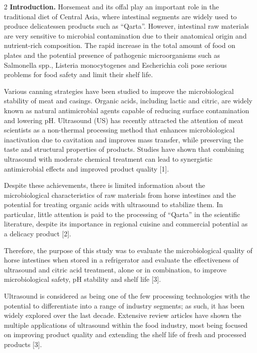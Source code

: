\begin{multicols}{2}
{\bfseries Introduction.} Horsemeat and its offal play an important role in
the traditional diet of Central Asia, where intestinal segments are
widely used to produce delicatessen products such as ``Qarta''. However,
intestinal raw materials are very sensitive to microbial contamination
due to their anatomical origin and nutrient-rich composition. The rapid
increase in the total amount of food on plates and the potential
presence of pathogenic microorganisms such as Salmonella spp., Listeria
monocytogenes and Escherichia coli pose serious problems for food safety
and limit their shelf life.

Various canning strategies have been studied to improve the
microbiological stability of meat and casings. Organic acids, including
lactic and citric, are widely known as natural antimicrobial agents
capable of reducing surface contamination and lowering pH. Ultrasound
(US) has recently attracted the attention of meat scientists as a
non-thermal processing method that enhances microbiological inactivation
due to cavitation and improves mass transfer, while preserving the taste
and structural properties of products. Studies have shown that combining
ultrasound with moderate chemical treatment can lead to synergistic
antimicrobial effects and improved product quality {[}1{]}.

Despite these achievements, there is limited information about the
microbiological characteristics of raw materials from horse intestines
and the potential for treating organic acids with ultrasound to
stabilize them. In particular, little attention is paid to the
processing of ``Qarta'' in the scientific literature, despite its
importance in regional cuisine and commercial potential as a delicacy
product {[}2{]}.

Therefore, the purpose of this study was to evaluate the microbiological
quality of horse intestines when stored in a refrigerator and evaluate
the effectiveness of ultrasound and citric acid treatment, alone or in
combination, to improve microbiological safety, pH stability and shelf
life {[}3{]}.

Ultrasound is considered as being one of the few processing technologies
with the potential to differentiate into a range of industry segments;
as such, it has been widely explored over the last decade. Extensive
review articles have shown the multiple applications of ultrasound
within the food industry, most being focused on improving product
quality and extending the shelf life of fresh and processed products
{[}3{]}.


\end{multicols}
